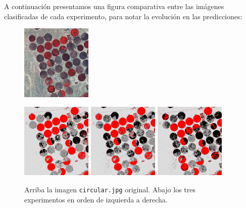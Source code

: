 \documentclass[a4paper,11pt]{article}
\begin{document}
A continuación presentamos una figura comparativa entre las imágenes clasificadas de cada experimento, para notar la evolución en las predicciones:

\begin{figure}[h!]
\centering
\includegraphics[width=0.3\textwidth]{img/circular.jpg}

\includegraphics[width=0.3\textwidth]{img/ej3-caso1-equi-clasif.png}
\includegraphics[width=0.3\textwidth]{img/ej3-caso2-equi-clasif.png}
\includegraphics[width=0.3\textwidth]{img/ej3-caso3-equi-clasif.png}

\caption{Arriba la imagen {\tt circular.jpg} original. Abajo los tres experimentos en orden de izquierda a derecha.}
\label{ej3-integrado}
\end{figure}
\end{document}
